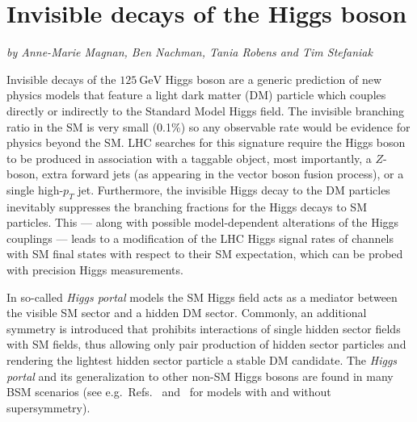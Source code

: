 \documentclass[../report.tex]{subfiles}
\begin{document}
\section{Invisible decays of the Higgs boson}

\begin{center}
\textit{by Anne-Marie Magnan, Ben Nachman, Tania Robens and Tim Stefaniak}
\end{center}

Invisible decays of the $125~\mathrm{GeV}$ Higgs boson are a generic prediction of new physics models that feature a light dark matter (DM) particle which couples directly or indirectly to the Standard Model Higgs field. The invisible branching ratio in the SM is very small (0.1\%) so any observable rate would be evidence for physics beyond the SM.  LHC searches for this signature require the Higgs boson to be produced in association with a taggable object, most importantly, a $Z$-boson, extra forward jets (as appearing in the vector boson fusion process), or a single high-$p_T$ jet. Furthermore, the invisible Higgs decay to the DM particles inevitably suppresses the branching fractions for the Higgs decays to SM particles. This --- along with possible model-dependent alterations of the Higgs couplings --- leads to a modification of the LHC Higgs signal rates of channels with SM final states with respect to their SM expectation, which can be probed with precision Higgs measurements. 

In so-called \emph{Higgs portal} models the SM Higgs field acts as a mediator between the visible SM sector and a hidden DM sector. {Commonly,} an additional symmetry {is introduced that} prohibits interactions of single hidden sector fields with SM fields, thus allowing only pair production of hidden sector particles and rendering the lightest hidden sector particle a stable DM candidate. 
The \emph{Higgs portal} and its generalization to other non-SM Higgs bosons are found in many BSM scenarios (see e.g.~Refs.~\cite{McDonald:2008up,McDonald:2008ua,ArkaniHamed:2006mb,Profumo:2017ntc} and~\cite{Barger:2008jx,Cohen:2011ec,Englert:2011yb,Goudelis:2013uca,Bai:2012nv,Berlin:2015wwa} for models with and without supersymmetry). 
\end{document}
